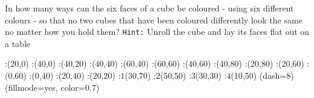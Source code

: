 
%
%
%
%
% 
% 


\question[5] In how many ways can the six faces of a cube be coloured - using six different colours - 
so that no two cubes that have been coloured differently look the same no matter how you hold them?
\texttt{Hint:} Unroll the cube and lay its faces flat out on a table


\ifprintanswers
  \begin{marginfigure}
      :(20,0)
      :(40,0)
      :(40,20)
      :(40,40)
      :(60,40)
      :(60,60)
      :(40,60)
      :(40,80)
      :(20,80) 
      :(20,60)
      :(0,60)
      :(0,40)
      :(20,40)
      :(20,20)
      :$1$(30,70)
      :$2$(50,50)
      :$3$(30,30)
      :$4$(10,50)
    \figdrawbegin{}
      \figdrawline[100,101,102,103,104,105,106,107,108,109,110,111,112,113,100]
      \figset (dash=8)
      \figdrawline[103,106,109,112,103]
      \figset (fillmode=yes, color=0.7)
      \figdrawline[100,101,102,113,100]
    \figdrawend
    \centerline{\box\figBoxA}
  \end{marginfigure}
  

